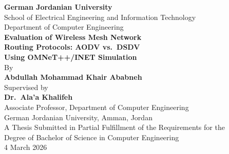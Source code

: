 \begin{titlepage}
\centering

\vspace*{1cm}

{\Large \textbf{German Jordanian University}}\\[0.3cm]
{\large School of Electrical Engineering and Information Technology}\\[0.2cm]
{\large Department of Computer Engineering}\\[2cm]

{\LARGE \textbf{Evaluation of Wireless Mesh Network}}\\[0.3cm]
{\LARGE \textbf{Routing Protocols: AODV vs.\ DSDV}}\\[0.3cm]
{\LARGE \textbf{Using OMNeT++/INET Simulation}}\\[2cm]

{\large By}\\[0.3cm]
{\Large \textbf{Abdullah Mohammad Khair Ababneh}}\\[2cm]

{\large Supervised by}\\[0.3cm]
{\large \textbf{Dr.\ Ala'a Khalifeh}}\\[0.1cm]
{\normalsize Associate Professor, Department of Computer Engineering}\\
{\normalsize German Jordanian University, Amman, Jordan}\\[2cm]

{\normalsize A Thesis Submitted in Partial Fulfillment of the Requirements for the}\\
{\normalsize Degree of Bachelor of Science in Computer Engineering}\\[1.5cm]

{\large 4 March 2026}

\end{titlepage}
